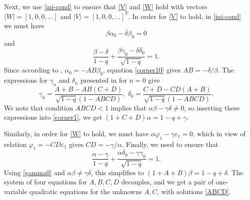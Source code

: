 \documentclass{amsart}
\theoremstyle{definition}
\theoremstyle{remark}
\theoremstyle{remark}
\theoremstyle{definition}
\numberwithin{equation}{section}
\begin{document}
Next, we use \eqref{ini-cond}  to ensure that \eqref{V} and \eqref{W} hold with  vectors $\langle W|=[1,0,0,\dots]$ and
$|V\rangle=[1,0,0,\dots]^T$. In order for \eqref{V} to hold,  in  \eqref{ini-cond} we must have
\begin{equation}
  \label{corner10}
  \beta\alpha_0-\delta\beta_0=0
\end{equation} and
\begin{equation}
  \label{corner1}
  \frac{\beta-\delta}{1-q}+\frac{\beta\gamma_0-\delta \delta_0}{\sqrt{1-q}}=1.
\end{equation}
Since according to  \cite[page 1243]{Bryc-Wesolowski-08}, $\alpha_0=-AB \beta_0$,  equation \eqref{corner10} gives
$AB=-\delta/\beta$. The expressions for $\gamma_n$ and $\delta_n$  presented in  \cite[page 1243]{Bryc-Wesolowski-08}  for
$n=0$   give
\begin{equation}
  \label{gamma0}
  \gamma_0=\frac{A+B-AB(C+D)}{\sqrt{1-q}(1-ABCD)}, \;
  \delta_0=\frac{C+D-CD(A+B)}{\sqrt{1-q}(1-ABCD)}.
\end{equation}
We note that condition $ABCD<1$ implies that $\alpha\beta-\gamma\delta\ne 0$, so inserting these expressions into \eqref{corner1},    we get
$(1+C+D)\alpha=1-q+\gamma$.

Similarly, in order for \eqref{W} to hold, we must have $\alpha\varphi_1-\gamma{\varepsilon}_1=0$,
 which  in view of relation $\varphi_1=-CD{\varepsilon}_1$  \cite[page 1243]{Bryc-Wesolowski-08}
gives $CD=-\gamma/\alpha$. Finally, we need to ensure that
$$
\frac{\alpha-\gamma}{1-q}+\frac{\alpha \delta_0-\gamma\gamma_0}{\sqrt{1-q}}=1.
$$
Using \eqref{gamma0} and $\alpha\beta\ne\gamma\delta$, this simplifies to $(1+A+B)\beta=1-q+\delta$. The system of four equations for $A,B,C,D$ decouples,
 and we get a  pair of one-variable quadratic equations for the unknowns $A,C$,  with solutions \eqref{ABCD}.
\end{document}
